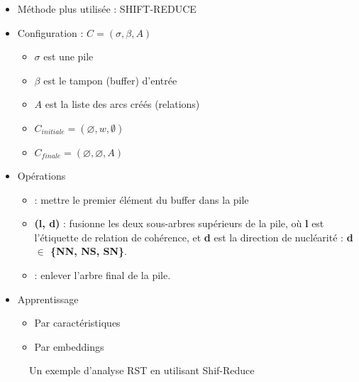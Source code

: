 \documentclass{KodeBook}
\begin{document}
\begin{minipage}{.6\textwidth}
	\begin{itemize}
		\item Méthode plus utilisée : SHIFT-REDUCE
		\item Configuration : $C = (\sigma, \beta, A)$
		\begin{itemize}
			\item $\sigma$ est une pile
			\item $\beta$ est le tampon (buffer) d'entrée
			\item $A$ est la liste des arcs créés (relations)
			\item $C_{initiale} = (\varnothing, w, \emptyset)$
			\item $C_{finale} = (\varnothing, \varnothing, A)$
		\end{itemize}
	\end{itemize}
\end{minipage}
\begin{minipage}{.38\textwidth}
\end{minipage}
\begin{itemize}
	\item Opérations 
	\begin{itemize}
		\item {} : mettre le premier élément du buffer dans la pile
		\item {}\textbf{(l, d)} : fusionne les deux sous-arbres supérieurs de la pile, où \textbf{l} est l'étiquette de relation de cohérence, et \textbf{d} est la direction de nucléarité : \textbf{d $ \in $ \{NN, NS, SN\}}.
		\item {} : enlever l'arbre final de la pile.
	\end{itemize}
	\item Apprentissage 
	\begin{itemize}
		\item Par caractéristiques
		\item Par embeddings
	\end{itemize}
\end{itemize}

\begin{figure}[ht]
	
	\caption{Un exemple d'analyse RST en utilisant Shif-Reduce \cite{2018-yu-al}}
\end{figure}
\end{document}
